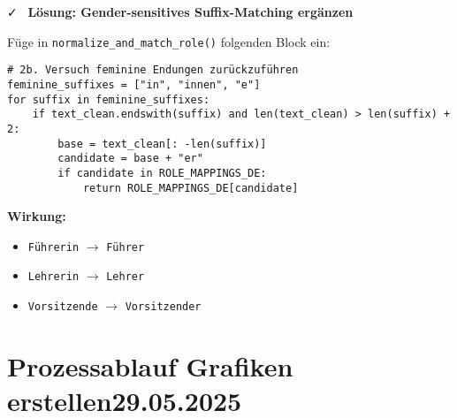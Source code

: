 \documentclass{article}
\begin{document}
\vspace{1em}
\faCheck~ \textbf{Lösung: Gender-sensitives Suffix-Matching ergänzen}

Füge in \texttt{normalize\_and\_match\_role()} folgenden Block ein:

\begin{verbatim}
# 2b. Versuch feminine Endungen zurückzuführen
feminine_suffixes = ["in", "innen", "e"]
for suffix in feminine_suffixes:
    if text_clean.endswith(suffix) and len(text_clean) > len(suffix) + 2:
        base = text_clean[: -len(suffix)]
        candidate = base + "er"
        if candidate in ROLE_MAPPINGS_DE:
            return ROLE_MAPPINGS_DE[candidate]
\end{verbatim}

\vspace{0.5em}
\textbf{Wirkung:}

\begin{itemize}
  \item \texttt{Führerin} $\rightarrow$ \texttt{Führer}
  \item \texttt{Lehrerin} $\rightarrow$ \texttt{Lehrer}
  \item \texttt{Vorsitzende} $\rightarrow$ \texttt{Vorsitzender}
\end{itemize}

\vspace{1em}
\noindent\hrulefill

\section{Prozessablauf Grafiken erstellen\small 29.05.2025}
\end{document}
